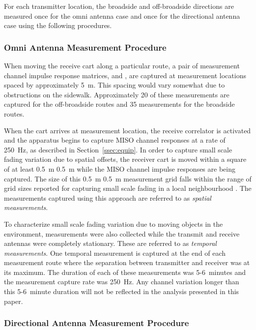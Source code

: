 \documentclass[12pt]{IEEEtran}
\begin{document}
For each transmitter location, the broadside and off-broadside directions are measured once for the omni antenna case and once for the directional antenna case using the following procedures.


\subsubsection{Omni Antenna Measurement Procedure}
\label{ssec:omni-proc}

When moving the receive cart along a particular route,  a pair of  measurement channel impulse response matrices,  and , are captured at measurement locations spaced by approximately 5~m.  This spacing would vary somewhat due to obstructions on the sidewalk. Approximately 20 of these measurements are captured for the off-broadside routes and 35 measurements for the broadside routes. 

When the cart arrives at measurement location, the receive correlator is activated and the apparatus begins to capture MISO channel responses at a rate of 250~Hz, as described in Section~\ref{ssec:equip}.  In order to capture small scale fading variation due to spatial offsets, the receiver cart is moved within a square of at least 0.5~m  0.5~m while the MISO channel impulse responses are being captured.  The size of this 0.5~m  0.5~m measurement grid falls within the range of grid sizes reported for capturing small scale fading in a local neighbourhood \cite{chiu-s-2010,chee-kl-2012}.  The measurements captured using this approach are referred to as {\em spatial measurements}.

To characterize small scale fading variation due to moving objects in the environment, measurements were also collected while the transmit and receive antennas were completely stationary.  These are referred to as {\em temporal measurements}.  One temporal measurement is captured at the end of each measurement route where the separation between transmitter and receiver was at its maximum.  The duration of each of these measurements was 5-6~minutes and the measurement capture rate was 250~Hz.  Any channel variation longer than this 5-6~minute duration will not be reflected in the analysis presented in this paper. 

 
\subsubsection{Directional Antenna Measurement Procedure}
\label{ssec:dir-proc}
\end{document}
